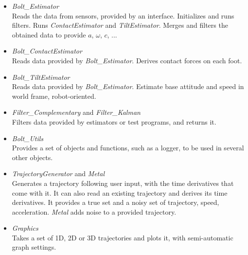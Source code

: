 \documentclass[a4paper,10pt]{article}
\begin{document}
\begin{itemize}
	\item{\textit{Bolt\_Estimator} \\
	Reads the data from sensors, provided by an interface. Initializes and runs filters. Runs \textit{ContactEstimator} and \textit{TiltEstimator}. Merges and filters the obtained data to provide $a$, $\omega$, $c$, ...}
	\item{\textit{Bolt\_ContactEstimator} \\
	Reads data provided by \textit{Bolt\_Estimator}. Derives contact forces on each foot.
	}
	\item{\textit{Bolt\_TiltEstimator} \\
	Reads data provided by \textit{Bolt\_Estimator}. Estimate base attitude and speed in world frame, robot-oriented.
	}
	\item{\textit{Filter\_Complementary} and \textit{Filter\_Kalman} \\
	Filters data provided by estimators or test programs, and returns it.
	}
	\item{\textit{Bolt\_Utils}\\
	Provides a set of objects and functions, such as a logger, to be used in several other objects.
	}
	\item{\textit{TrajectoryGenerator} and \textit{Metal}\\
	Generates a trajectory following user input, with the time derivatives that come with it. It can also read an existing trajectory and derives its time derivatives. It provides a true set and a noisy set of trajectory, speed, acceleration.
	\textit{Metal} adds noise to a provided trajectory.
	}
	\item{\textit{Graphics}\\
	Takes a set of 1D, 2D or 3D trajectories and plots it, with semi-automatic graph settings. }
\end{itemize}
\end{document}
